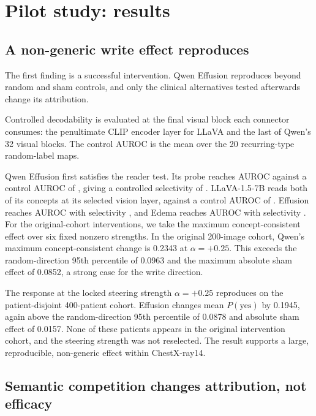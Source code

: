 \section{Pilot study: results}
\label{app:seed-results}



\subsection{A non-generic write effect reproduces}
\label{sec:qwen-replication}

The first finding is a successful intervention. Qwen Effusion reproduces beyond random and sham controls, and only the clinical alternatives tested afterwards change its attribution.

Controlled decodability is evaluated at the final visual block each connector consumes: the penultimate CLIP encoder layer for LLaVA and the last of Qwen's 32 visual blocks. The control AUROC is the mean over the 20 recurring-type random-label maps.

Qwen Effusion first satisfies the reader test. Its probe reaches AUROC \cfSeedDecQwenEffAuroc{} against a control AUROC of \cfSeedDecQwenEffCtrl{}, giving a controlled selectivity of \cfSeedDecQwenEffSel{}. LLaVA-1.5-7B reads both of its concepts at its selected vision layer, against a control AUROC of \cfSeedDecLlavaEffCtrl{}. Effusion reaches AUROC \cfSeedDecLlavaEffAuroc{} with selectivity \cfSeedDecLlavaEffSel{}, and Edema reaches AUROC \cfSeedDecLlavaEdemaAuroc{} with selectivity \cfSeedDecLlavaEdemaSel{}. For the original-cohort interventions, we take the maximum concept-consistent effect over six fixed nonzero strengths. In the original 200-image cohort, Qwen's maximum concept-consistent change is 0.2343 at $\alpha=+0.25$. This exceeds the random-direction 95th percentile of 0.0963 and the maximum absolute sham effect of 0.0852, a strong case for the write direction.

The response at the locked steering strength $\alpha=+0.25$ reproduces on the patient-disjoint 400-patient cohort. Effusion changes mean $P(\mathrm{yes})$ by 0.1945, again above the random-direction 95th percentile of 0.0878 and absolute sham effect of 0.0157. None of these patients appears in the original intervention cohort, and the steering strength was not reselected. The result supports a large, reproducible, non-generic effect within ChestX-ray14.


\subsection{Semantic competition changes attribution, not efficacy}
\label{sec:specificity-results}

